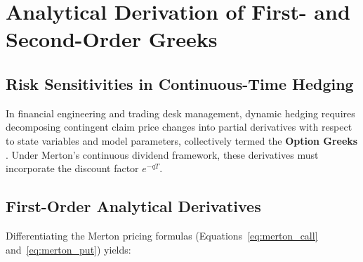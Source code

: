 
\section{Analytical Derivation of First- and Second-Order Greeks}
\label{sec:greeks_derivation}

\subsection{Risk Sensitivities in Continuous-Time Hedging}

In financial engineering and trading desk management, dynamic hedging requires decomposing contingent claim price changes into partial derivatives with respect to state variables and model parameters, collectively termed the \textbf{Option Greeks} \citep{hull2018options}. Under Merton's continuous dividend framework, these derivatives must incorporate the discount factor $e^{-qT}$.

\subsection{First-Order Analytical Derivatives}

Differentiating the Merton pricing formulas (Equations~\eqref{eq:merton_call} and~\eqref{eq:merton_put}) yields:

